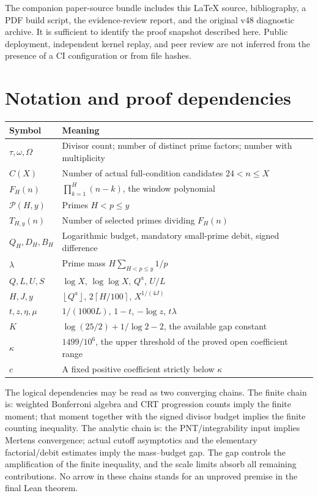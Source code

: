 \documentclass[11pt,a4paper]{article}
\theoremstyle{definition}
\theoremstyle{remark}
\numberwithin{equation}{section}
\newcommand{\Pset}{\mathcal P}
\newcommand{\rate}{\kappa}
\newcommand{\floor}[1]{\left\lfloor #1\right\rfloor}
\newcommand{\ceil}[1]{\left\lceil #1\right\rceil}
\begin{document}
The companion paper-source bundle includes this LaTeX source, bibliography,
a PDF build script, the evidence-review report, and the original v48 diagnostic
archive. It is sufficient to identify the proof snapshot described here.
Public deployment, independent kernel replay, and peer review are not inferred
from the presence of a CI configuration or from file hashes.

\section{Notation and proof dependencies}\label{app:notation}
\begin{center}
\begin{tabularx}{\textwidth}{@{}p{}X@{}}
\toprule
Symbol & Meaning \\
\midrule
$\tau,\omega,\Omega$ & Divisor count; number of distinct prime factors; number with multiplicity \\
$C(X)$ & Number of actual full-condition candidates $24<n\le X$ \\
$F_H(n)$ & $\prod_{k=1}^H(n-k)$, the window polynomial \\
$\Pset(H,y)$ & Primes $H<p\le y$ \\
$T_{H,y}(n)$ & Number of selected primes dividing $F_H(n)$ \\
$Q_H,D_H,B_H$ & Logarithmic budget, mandatory small-prime debit, signed difference \\
$\lambda$ & Prime mass $H\sum_{H<p\le y}1/p$ \\
$Q,L,U,S$ & $\log X$, $\log\log X$, $Q^a$, $U/L$ \\
$H,J,y$ & $\floor{Q^a}$, $2\ceil{H/100}$, $X^{1/(4J)}$ \\
$t,z,\eta,\mu$ & $1/(1000L)$, $1-t$, $-\log z$, $t\lambda$ \\
$K$ & $\log(25/2)+1/\log2-2$, the available gap constant \\
$\rate$ & $1499/10^6$, the upper threshold of the proved open coefficient range \\
$c$ & A fixed positive coefficient strictly below $\rate$ \\
\bottomrule
\end{tabularx}
\end{center}

The logical dependencies may be read as two converging chains. The finite
chain is: weighted Bonferroni algebra and CRT progression counts imply the
finite moment; that moment together with the signed divisor budget implies the
finite counting inequality. The analytic chain is: the PNT/integrability input
implies Mertens convergence; actual cutoff asymptotics and the elementary
factorial/debit estimates imply the mass--budget gap. The gap controls the
amplification of the finite inequality, and the scale limits absorb all
remaining contributions. No arrow in these chains stands for an unproved
premise in the final Lean theorem.



\end{document}
